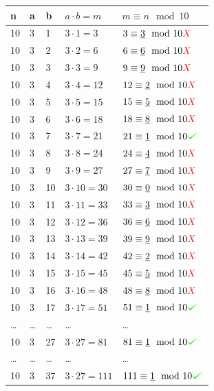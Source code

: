 \documentclass{scrartcl}
\def\checkmark{\tikz\fill[scale=0.4](0,.35) -- (.25,0) -- (1,.7) -- (.25,.15) -- cycle;}
\newcommand{\cmark}{\textcolor{green}{\checkmark}}
\newcommand{\xmark}{\textcolor{red}{X}}
\begin{document}
\begin{tabular}{|l|l|l|l|l|}
	\hline
	n & a & b & $a \cdot b = m$ & $m \equiv n \mod 10$ \\\hline
	10 & 3 & 1 & $3 \cdot 1 = 3$ & $3 \equiv \underline{3} \mod 10 \xmark$\\
	10 & 3 & 2 & $3 \cdot 2 = 6$ & $6 \equiv \underline{6} \mod 10 \xmark$\\
	10 & 3 & 3 & $3 \cdot 3 = 9$ & $9 \equiv \underline{9} \mod 10 \xmark$\\
	10 & 3 & 4 & $3 \cdot 4 = 12$ & $12 \equiv \underline{2} \mod 10 \xmark$\\
	10 & 3 & 5 & $3 \cdot 5 = 15$ & $15 \equiv \underline{5} \mod 10 \xmark$\\
	10 & 3 & 6 & $3 \cdot 6 = 18$ & $18 \equiv \underline{8} \mod 10 \xmark$\\
	10 & 3 & 7 & $3 \cdot 7 = 21$ & $21 \equiv \underline{1} \mod 10 \cmark$\\
	10 & 3 & 8 & $3 \cdot 8 = 24$ & $24 \equiv \underline{4} \mod 10 \xmark$\\
	10 & 3 & 9 & $3 \cdot 9 = 27$ & $27 \equiv \underline{7} \mod 10 \xmark$\\
	10 & 3 & 10 & $3 \cdot 10 = 30$ & $30 \equiv \underline{0} \mod 10 \xmark$\\
	10 & 3 & 11 & $3 \cdot 11 = 33$ & $33 \equiv \underline{3} \mod 10 \xmark$\\
	10 & 3 & 12 & $3 \cdot 12 = 36$ & $36 \equiv \underline{6} \mod 10 \xmark$\\
	10 & 3 & 13 & $3 \cdot 13 = 39$ & $39 \equiv \underline{9} \mod 10 \xmark$\\
	10 & 3 & 14 & $3 \cdot 14 = 42$ & $42 \equiv \underline{2} \mod 10 \xmark$\\
	10 & 3 & 15 & $3 \cdot 15 = 45$ & $45 \equiv \underline{5} \mod 10 \xmark$\\
	10 & 3 & 16 & $3 \cdot 16 = 48$ & $48 \equiv \underline{8} \mod 10 \xmark$\\
	10 & 3 & 17 & $3 \cdot 17 = 51$ & $51 \equiv \underline{1} \mod 10 \cmark$\\
	\dots & \dots & \dots & \dots & \dots\\
	10 & 3 & 27 & $3 \cdot 27 = 81$ & $81 \equiv \underline{1} \mod 10 \cmark$\\
	\dots & \dots & \dots & \dots & \dots\\
	10 & 3 & 37 & $3 \cdot 27 = 111$ & $111 \equiv \underline{1} \mod 10 \cmark$\\\hline
\end{tabular}
\end{document}
